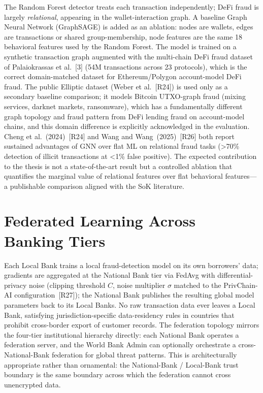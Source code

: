 \documentclass[12pt,a4paper]{report}
\begin{document}
The Random Forest detector treats each transaction independently; DeFi fraud is largely \emph{relational}, appearing in the wallet-interaction graph. A baseline Graph Neural Network (GraphSAGE) is added as an ablation: nodes are wallets, edges are transactions or shared group-membership, node features are the same 18 behavioral features used by the Random Forest. The model is trained on a synthetic transaction graph augmented with the multi-chain DeFi fraud dataset of Palaiokrassas et al.~[3] (54M transactions across 23 protocols), which is the correct domain-matched dataset for Ethereum/Polygon account-model DeFi fraud. The public Elliptic dataset (Weber et al.~[R24]) is used only as a secondary baseline comparison; it models Bitcoin UTXO-graph fraud (mixing services, darknet markets, ransomware), which has a fundamentally different graph topology and fraud pattern from DeFi lending fraud on account-model chains, and this domain difference is explicitly acknowledged in the evaluation. Cheng et al.~(2024)~[R24] and Wang and Wang~(2025)~[R26] both report sustained advantages of GNN over flat ML on relational fraud tasks (>70\% detection of illicit transactions at <1\% false positive). The expected contribution to the thesis is not a state-of-the-art result but a controlled ablation that quantifies the marginal value of relational features over flat behavioral features---a publishable comparison aligned with the SoK literature.

\section{Federated Learning Across Banking Tiers}
\label{sec:fl-fraud}

Each Local Bank trains a local fraud-detection model on its own borrowers' data; gradients are aggregated at the National Bank tier via FedAvg with differential-privacy noise (clipping threshold $C$, noise multiplier $\sigma$ matched to the PrivChain-AI configuration~[R27]); the National Bank publishes the resulting global model parameters back to its Local Banks. No raw transaction data ever leaves a Local Bank, satisfying jurisdiction-specific data-residency rules in countries that prohibit cross-border export of customer records. The federation topology mirrors the four-tier institutional hierarchy directly: each National Bank operates a federation server, and the World Bank Admin can optionally orchestrate a cross-National-Bank federation for global threat patterns. This is architecturally appropriate rather than ornamental: the National-Bank / Local-Bank trust boundary is the same boundary across which the federation cannot cross unencrypted data.
\end{document}
